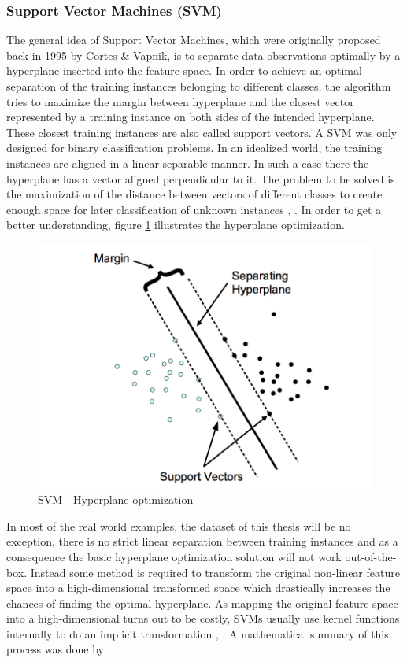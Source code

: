 \subsubsection{Support Vector Machines (SVM)}
The general idea of Support Vector Machines, which were originally proposed back in 1995 by Cortes \& Vapnik, is to separate data observations optimally by a hyperplane inserted into the feature space. In order to achieve an optimal separation of the training instances belonging to different classes, the algorithm tries to maximize the margin between hyperplane and the closest vector represented by a training instance on both sides of the intended hyperplane. These closest training instances are also called support vectors. A SVM was only designed for binary classification problems. In an idealized world, the training instances are aligned in a linear separable manner. In such a case there the hyperplane has a vector aligned perpendicular to it. The problem to be solved is the maximization of the distance between vectors of different classes to create enough space for later classification of unknown instances \cite{cortes1995support}, \cite{hearst1998support}. In order to get a better understanding, figure \ref{fig:svm} illustrates the hyperplane optimization. 

\begin{figure}
	\centering
	\includegraphics[width=1.0\textwidth]{img/svm.png}
	\caption{SVM - Hyperplane optimization \cite{meyer2001support}}
	\label{fig:svm}
\end{figure} 

In most of the real world examples, the dataset of this thesis will be no exception, there is no strict linear separation between training instances and as a consequence the basic hyperplane optimization solution will not work out-of-the-box. Instead some method is required to transform the original non-linear feature space into a high-dimensional transformed space which drastically increases the chances of finding the optimal hyperplane. As mapping the original feature space into a high-dimensional turns out to be costly, SVMs usually use kernel functions internally to do an implicit transformation \cite{cortes1995support}, \cite{hearst1998support}. A mathematical summary of this process was done by \cite{hearst1998support}. 